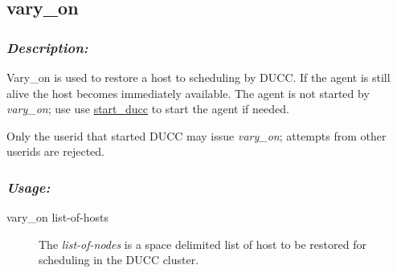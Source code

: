 \subsection{vary\_on}
\label{subsec:admin.vary-on}
    \subsubsection{{\em Description:}}

    Vary\_on is used to restore a host to scheduling by DUCC.  If the agent is still
    alive the host becomes immediately available.  The agent is not started by
    {\em vary\_on}; use use 
    \hyperref[subsec:admin.start-ducc]{start\_ducc} to start the agent if needed.

    Only the userid that started DUCC may issue {\em vary\_on}; attempts from other userids
    are rejected.
    
    \subsubsection{\em{Usage: }}

        \begin{description} 
          \item[vary\_on list-of-hosts]
            The {\em list-of-nodes} is a space delimited list of host to be restored for
              scheduling in the DUCC cluster.
        \end{description}
            
       
